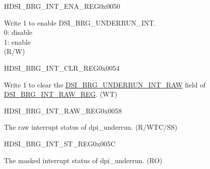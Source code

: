 \begin{register}{H}{DSI\_BRG\_INT\_ENA\_REG}{0x0050}\label{regdesc:DSIBRGINTENAREG}
%
%
\regnewline%
\begin{regdesc}\begin{reglist}
\label{fielddesc:DSIBRGUNDERRUNINTENA}\item [DSI\_BRG\_UNDERRUN\_INT\_ENA] Write 1 to enable DSI\_BRG\_UNDERRUN\_INT. \\0: disable\\1: enable \\(R/W)
\end{reglist}\end{regdesc}
\end{register}

\begin{register}{H}{DSI\_BRG\_INT\_CLR\_REG}{0x0054}\label{regdesc:DSIBRGINTCLRREG}
%
%
\regnewline%
\begin{regdesc}\begin{reglist}
\label{fielddesc:DSIBRGUNDERRUNINTCLR}\item [DSI\_BRG\_UNDERRUN\_INT\_CLR] Write 1 to clear the \hyperref[fielddesc:DSIBRGUNDERRUNINTRAW]{DSI\_BRG\_UNDERRUN\_INT\_RAW} field of \hyperref[regdesc:DSIBRGINTRAWREG]{DSI\_BRG\_INT\_RAW\_REG}. (WT)
\end{reglist}\end{regdesc}
\end{register}


\begin{register}{H}{DSI\_BRG\_INT\_RAW\_REG}{0x0058}\label{regdesc:DSIBRGINTRAWREG}
%
%
\regnewline%
\begin{regdesc}\begin{reglist}
\label{fielddesc:DSIBRGUNDERRUNINTRAW}\item [DSI\_BRG\_UNDERRUN\_INT\_RAW] The raw interrupt status of dpi\_underrun. (R/WTC/SS)
\end{reglist}\end{regdesc}
\end{register}


\begin{register}{H}{DSI\_BRG\_INT\_ST\_REG}{0x005C}\label{regdesc:DSIBRGINTSTREG}
%
%
\regnewline%
\begin{regdesc}\begin{reglist}
\label{fielddesc:DSIBRGUNDERRUNINTST}\item [DSI\_BRG\_UNDERRUN\_INT\_ST] The masked interrupt status of dpi\_underrun. (RO)
\end{reglist}\end{regdesc}
\end{register}


